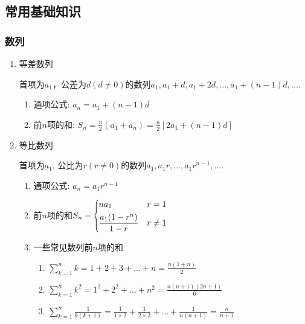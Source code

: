 \subsection{常用基础知识}
\subsubsection{数列}
\begin{enumerate}
\item 等差数列\par
首项为$ a_{1} $，公差为$ d(d\neq 0) $的数列$ a_{1},a_{1}+d,a_{1}+2d,...,a_{1}+(n-1)d,... $.
\begin{enumerate}
\item 通项公式: $ a_{n}=a_{1}+(n-1)d $
\item 前$ n $项的和: $ S_{n}=\frac{n}{2}(a_{1}+a_{n})=\frac{n}{2}[2a_{1}+(n-1)d] $
\end{enumerate}
\item 等比数列\par
首项为$ a_{1} $, 公比为$ r(r\neq 0) $的数列$ a_{1},a_{1}r,...,a_{1}r^{n-1},... $.
\begin{enumerate}
\item 通项公式: $ a_{n}=a_{1}r^{n-1} $
\item 前$ n $项的和$ S_{n}=\scaleleftright[6pt]{\biggl\{}{\begin{aligned}
& na_{1}\ & r=1 \\
& \frac{a_{1}(1-r^{n})}{1-r} & r\neq 1
\end{aligned}}{.} $
\item 一些常见数列前$ n $项的和\par
\begin{enumerate}
\item $ \sum_{k=1}^{n}k=1+2+3+...+n=\frac{n(1+n)}{2} $
\item $ \sum_{k=1}^{n}k^{2}=1^{2}+2^{2}+...+n^{2}=\frac{n(n+1)(2n+1)}{6} $
\item $ \sum_{k=1}^{n}\frac{1}{k(k+1)}=\frac{1}{1\times 2}+\frac{1}{2\times 3}+...+\frac{1}{n(n+1)}=\frac{n}{n+1} $
\end{enumerate}
\end{enumerate}
\end{enumerate}
